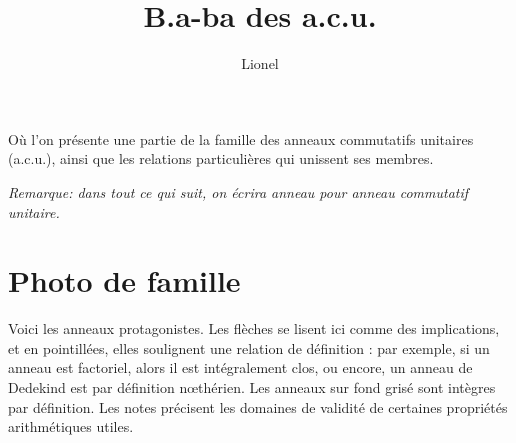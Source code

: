 \documentclass[a4paper,11pt]{article}
\title{B.a-ba des a.c.u.}
\author{Lionel \bsc{V\kern-1pt idal}}
\renewenvironment{abstract}%
  {\quotation\noindent\ignorespaces}%
  {\endquotation}
\begin{document}
\maketitle
\begin{abstract}
  Où l'on présente une partie de la famille des anneaux
  commutatifs unitaires (a.c.u.), ainsi que les relations particulières
  qui unissent ses membres.

  \smallskip\itshape
  Remarque: dans tout ce qui suit, on écrira anneau pour
  anneau commutatif unitaire.
\end{abstract}

\section{Photo de famille}

Voici les anneaux protagonistes.  Les flèches se lisent ici comme des
implications, et en pointillées, elles soulignent une relation de
définition : par exemple, si un anneau est factoriel, alors il est
intégralement clos, ou encore, un anneau de Dedekind est par définition
nœthérien. Les anneaux sur fond grisé sont intègres par définition. Les
notes précisent les domaines de validité de certaines propriétés
arithmétiques utiles.
\end{document}
